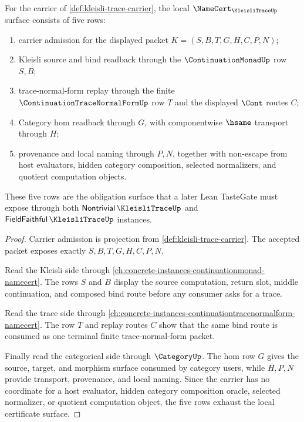 \begin{theorem}
\label{thm:kleisli-trace-namecert-obligation-surface}
For the carrier of \autoref{def:kleisli-trace-carrier}, the local $\NameCert_{\KleisliTraceUp}$ surface consists of five rows:
\begin{enumerate}
\item carrier admission for the displayed packet $K=(S,B,T,G,H,C,P,N)$;
\item Kleisli source and bind readback through the $\ContinuationMonadUp$ row $S,B$;
\item trace-normal-form replay through the finite $\ContinuationTraceNormalFormUp$ row $T$ and the displayed $\Cont$ routes $C$;
\item Category hom readback through $G$, with componentwise $\hsame$ transport through $H$;
\item provenance and local naming through $P,N$, together with non-escape from host evaluators, hidden category composition, selected normalizers, and quotient computation objects.
\end{enumerate}
These five rows are the obligation surface that a later Lean TasteGate must expose through both $\mathsf{Nontrivial}\,\KleisliTraceUp$ and $\mathsf{FieldFaithful}\,\KleisliTraceUp$ instances.
\end{theorem}
\begin{proof}
Carrier admission is projection from \autoref{def:kleisli-trace-carrier}. The accepted packet exposes exactly $S,B,T,G,H,C,P,N$.

Read the Kleisli side through \autoref{ch:concrete-instances-continuationmonad-namecert}. The rows $S$ and $B$ display the source computation, return slot, middle continuation, and composed bind route before any consumer asks for a trace.

Read the trace side through \autoref{ch:concrete-instances-continuationtracenormalform-namecert}. The row $T$ and replay routes $C$ show that the same bind route is consumed as one terminal finite trace-normal-form packet.

Finally read the categorical side through $\CategoryUp$. The hom row $G$ gives the source, target, and morphism surface consumed by category users, while $H,P,N$ provide transport, provenance, and local naming. Since the carrier has no coordinate for a host evaluator, hidden category composition oracle, selected normalizer, or quotient computation object, the five rows exhaust the local certificate surface.
\end{proof}

